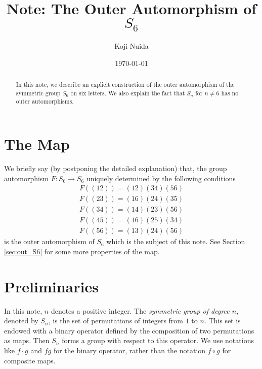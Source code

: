 \documentclass[11pt]{article}
\title{Note: The Outer Automorphism of $S_6$}
\author{Koji Nuida}
\date{\today}
\begin{document}
\maketitle

\begin{abstract}
In this note, we describe an explicit construction of the outer automorphism of the symmetric group $S_6$ on six letters.
We also explain the fact that $S_n$ for $n \neq 6$ has no outer automorphisms.
\end{abstract}

\section{The Map}
\label{sec:the_map}

We briefly say (by postponing the detailed explanation) that, the group automorphism $F \colon S_6 \to S_6$ uniquely determined by the following conditions
\begin{displaymath}
\begin{split}
F((12)) = (12)(34)(56) \\
F((23)) = (16)(24)(35) \\
F((34)) = (14)(23)(56) \\
F((45)) = (16)(25)(34) \\
F((56)) = (13)(24)(56)
\end{split}
\end{displaymath}
is the outer automorphism of $S_6$ which is the subject of this note.
See Section \ref{sec:out_S6} for some more properties of the map.

\section{Preliminaries}
\label{sec:preliminary}

In this note, $n$ denotes a positive integer.
The \emph{symmetric group of degree $n$}, denoted by $S_n$, is the set of permutations of integers from $1$ to $n$.
This set is endowed with a binary operator defined by the composition of two permutations as maps.
Then $S_n$ forms a group with respect to this operator.
We use notations like $f \cdot g$ and $fg$ for the binary operator, rather than the notation $f \circ g$ for composite maps.
\end{document}
